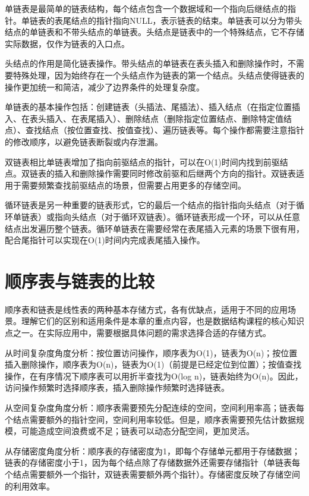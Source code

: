 \documentclass[12pt, a4paper]{article}
\begin{document}
单链表是最简单的链表结构，每个结点包含一个数据域和一个指向后继结点的指针。单链表的表尾结点的指针指向NULL，表示链表的结束。单链表可以分为带头结点的单链表和不带头结点的单链表。头结点是链表中的一个特殊结点，它不存储实际数据，仅作为链表的入口点。

头结点的作用是简化链表操作。带头结点的单链表在表头插入和删除操作时，不需要特殊处理，因为始终存在一个头结点作为链表的第一个结点。头结点使得链表的操作更加统一和简洁，减少了边界条件的处理复杂度。

单链表的基本操作包括：创建链表（头插法、尾插法）、插入结点（在指定位置插入、在表头插入、在表尾插入）、删除结点（删除指定位置结点、删除特定值结点）、查找结点（按位置查找、按值查找）、遍历链表等。每个操作都需要注意指针的修改顺序，以避免链表断裂或内存泄漏。

双链表相比单链表增加了指向前驱结点的指针，可以在O(1)时间内找到前驱结点。双链表的插入和删除操作需要同时修改前驱和后继两个方向的指针。双链表适用于需要频繁查找前驱结点的场景，但需要占用更多的存储空间。

循环链表是另一种重要的链表形式，它的最后一个结点的指针指向头结点（对于循环单链表）或指向头结点（对于循环双链表）。循环链表形成一个环，可以从任意结点出发遍历整个链表。循环单链表在需要经常在表尾插入元素的场景下很有用，配合尾指针可以实现在O(1)时间内完成表尾插入操作。

\section{顺序表与链表的比较}

顺序表和链表是线性表的两种基本存储方式，各有优缺点，适用于不同的应用场景。理解它们的区别和适用条件是本章的重点内容，也是数据结构课程的核心知识点之一。在实际应用中，需要根据具体问题的需求选择合适的存储方式。

从时间复杂度角度分析：按位置访问操作，顺序表为O(1)，链表为O(n)；按位置插入删除操作，顺序表为O(n)，链表为O(1)（前提是已经定位到位置）；按值查找操作，在有序情况下顺序表可以用折半查找为O(log n)，链表始终为O(n)。因此，访问操作频繁时选择顺序表，插入删除操作频繁时选择链表。

从空间复杂度角度分析：顺序表需要预先分配连续的空间，空间利用率高；链表每个结点需要额外的指针空间，空间利用率较低。但是，顺序表需要预先估计数据规模，可能造成空间浪费或不足；链表可以动态分配空间，更加灵活。

从存储密度角度分析：顺序表的存储密度为1，即每个存储单元都用于存储数据；链表的存储密度小于1，因为每个结点除了存储数据外还需要存储指针（单链表每个结点需要额外一个指针，双链表需要额外两个指针）。存储密度反映了存储空间的利用效率。
\end{document}
